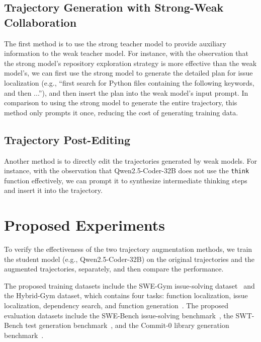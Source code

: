 \subsection{Trajectory Generation with Strong-Weak Collaboration}
The first method is to use the strong teacher model to provide auxiliary information to the weak teacher model.
For instance, with the observation that the strong model's repository exploration strategy is more effective than the weak model's, we can first use the strong model to generate the detailed plan for issue localization (e.g., ``first search for Python files containing the following keywords, and then ...''), and then insert the plan into the weak model's input prompt.
In comparison to using the strong model to generate the entire trajectory, this method only prompts it once, reducing the cost of generating training data.

\subsection{Trajectory Post-Editing}
Another method is to directly edit the trajectories generated by weak models.
For instance, with the observation that Qwen2.5-Coder-32B does not use the \texttt{think} function effectively, we can prompt it to synthesize intermediate thinking steps and insert it into the trajectory.


\section{Proposed Experiments}
To verify the effectiveness of the two trajectory augmentation methods, we train the student model (e.g., Qwen2.5-Coder-32B) on the original trajectories and the augmented trajectories, separately, and then compare the performance.

The proposed training datasets include the SWE-Gym issue-solving dataset~\cite{swegym} and the Hybrid-Gym dataset, which contains four tasks: function localization, issue localization, dependency search, and function generation~\cite{hybrid-gym}.
The proposed evaluation datasets include the SWE-Bench issue-solving benchmark~\cite{swebench}, the SWT-Bench test generation benchmark~\cite{swt-bench}, and the Commit-0 library generation benchmark~\cite{commit0}.